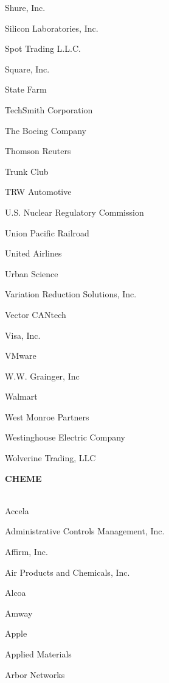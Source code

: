 \documentclass[twoside]{article}
\begin{document}
\begin{center}
\begin{multicols}{5}
\begin{FlushLeft}
\begin{compactitem}
\item Shure, Inc.
\item Silicon Laboratories, Inc.
\item Spot Trading L.L.C.
\item Square, Inc.
\item State Farm
\item TechSmith Corporation
\item The Boeing Company
\item Thomson Reuters
\item Trunk Club
\item TRW Automotive
\item U.S. Nuclear Regulatory Commission
\item Union Pacific Railroad
\item United Airlines
\item Urban Science
\item Variation Reduction Solutions, Inc.
\item Vector CANtech
\item Visa, Inc.
\item VMware
\item W.W. Grainger, Inc
\item Walmart
\item West Monroe Partners
\item Westinghouse Electric Company
\item Wolverine Trading, LLC
\end{compactitem}
        \end{FlushLeft}
        \vspace{1em}
        {\fontsize{14}{16}\selectfont \bf CHEME}\\
        \vspace{-1em}
        ~\hrulefill~
        \vspace{-.9em}
        \begin{FlushLeft}
        \begin{compactitem}
        \item Accela
\item Administrative Controls Management, Inc.
\item Affirm, Inc.
\item Air Products and Chemicals, Inc.
\item Alcoa
\item Amway
\item Apple
\item Applied Materials
\item Arbor Networks

\end{compactitem}
\end{FlushLeft}
\end{multicols}
\end{center}
\end{document}
